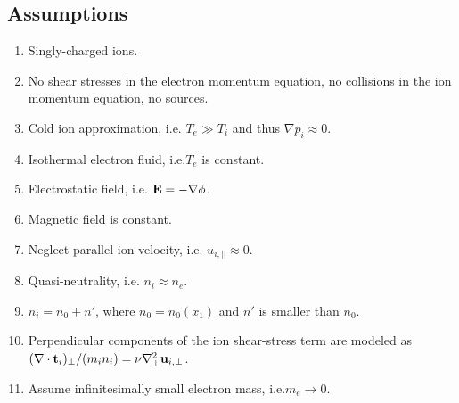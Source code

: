 \documentclass[11pt]{article}
\begin{document}
\subsection{Assumptions}
\begin{enumerate}
    \item Singly-charged ions. \label{it:hw_single_charge_ions}
    \item No shear stresses in the electron momentum equation, no collisions in the ion momentum equation, no sources. \label{it:hw_no_shear_source_coll}
    \item Cold ion approximation, i.e. $T_e \gg T_i$ and thus $\nabla p_i \approx 0$. \label{it:hw_cold}
    \item Isothermal electron fluid, i.e.\@ $T_e$ is constant. \label{it:hw_isothermal_electron}
    \item Electrostatic field, i.e. $\mathbf{E} = -\nabla \phi$. \label{it:hw_electrostatic}
    \item Magnetic field is constant.
    \item Neglect parallel ion velocity, i.e. $u_{i,||} \approx 0$. \label{it:hw_par_ion}
    \item Quasi-neutrality, i.e. $n_i \approx n_e$. \label{it:hw_quasineutrality}
    \item $n_i = n_0 + n'$, where $n_0 = n_0(x_1)$ and $n'$ is smaller than $n_0$. \label{it:hw_ion_density}
    \item Perpendicular components of the ion shear-stress term are modeled as $(\nabla \cdot \mathbf{t}_i)_\perp/(m_i n_i) = \nu \nabla_\perp^2 \mathbf{u}_{i,\perp}$. \label{it:hw_shear_stress}
    \item Assume infinitesimally small electron mass, i.e.\@ $m_e \to 0$. \label{it:hw_small_electron_mass}
\end{enumerate}

\end{document}
